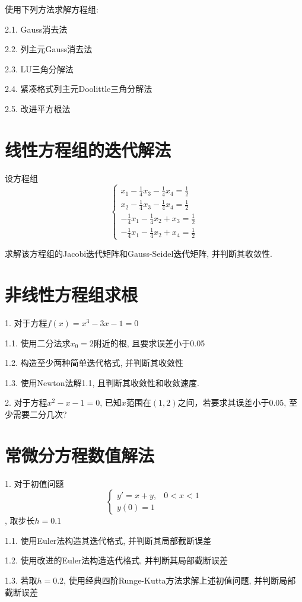 使用下列方法求解方程组:

2.1. Gauss消去法

2.2. 列主元Gauss消去法

2.3. LU三角分解法

2.4. 紧凑格式列主元Doolittle三角分解法

2.5. 改进平方根法

\section*{线性方程组的迭代解法}

设方程组
\begin{equation*}
    \begin{cases}
        x_1-\frac{1}{4}x_3-\frac{1}{4}x_4=\frac{1}{2}\\
        x_2-\frac{1}{4}x_3-\frac{1}{4}x_4=\frac{1}{2}\\
        -\frac{1}{4}x_1-\frac{1}{4}x_2+x_3=\frac{1}{2}\\
        -\frac{1}{4}x_1-\frac{1}{4}x_2+x_4=\frac{1}{2}
    \end{cases}
\end{equation*}

求解该方程组的Jacobi迭代矩阵和Gauss-Seidel迭代矩阵, 并判断其收敛性.

\section*{非线性方程组求根}

1. 对于方程$f(x)=x^3-3x-1=0$

1.1. 使用二分法求$x_0=2$附近的根, 且要求误差小于0.05

1.2. 构造至少两种简单迭代格式, 并判断其收敛性

1.3. 使用Newton法解1.1, 且判断其收敛性和收敛速度.

2. 对于方程$x^2-x-1=0$, 已知$x$范围在$(1,2)$之间，若要求其误差小于0.05, 至少需要二分几次?

\section*{常微分方程数值解法}

1. 对于初值问题
\begin{equation*}
    \begin{cases}
        y'=x+y, &0<x<1\\
        y(0)=1
    \end{cases}
\end{equation*}, 取步长$h=0.1$

1.1. 使用Euler法构造其迭代格式, 并判断其局部截断误差

1.2. 使用改进的Euler法构造迭代格式, 并判断其局部截断误差

1.3. 若取$h=0.2$, 使用经典四阶Runge-Kutta方法求解上述初值问题, 并判断局部截断误差